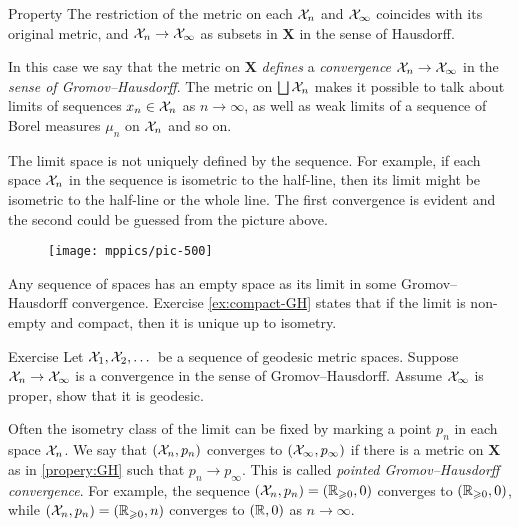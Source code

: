 \begin{thm}{Property}\label{propery:GH}
The restriction of the metric on each $\mathcal{X}_n$ and $\mathcal{X}_\infty$ coincides with its original metric, 
and $\mathcal{X}_n\to \mathcal{X}_\infty$ as subsets in $\bm{X}$ in the sense of Hausdorff.
\end{thm}

In this case we say that the metric on $\bm{X}$ \textit{defines} a \emph{convergence} $\mathcal{X}_n\to \mathcal{X}_\infty$ in the {}\emph{sense of Gromov--Hausdorff}.
The metric on  $\bigsqcup \mathcal{X}_n$ makes it possible to talk about limits of sequences $x_n\in \mathcal{X}_n$ as $n\to\infty$, as well as weak limits of a sequence of Borel measures $\mu_n$ on $\mathcal{X}_n$ and so on.

The limit space is not uniquely defined by the sequence.
For example, if each space $\mathcal{X}_n$ in the sequence is isometric to the half-line, then its limit might be isometric to the half-line or the whole line.
The first convergence is evident and the second could be guessed from the picture above.

\begin{figure}[ht!]
\vskip-0mm
\centering
\texttt{[image: mppics/pic-500]}
\end{figure}

Any sequence of spaces has an empty space as its limit in some  Gromov--Hausdorff convergence.
Exercise \ref{ex:compact-GH} states that if the limit is non-empty and compact, then it is unique up to isometry. 

\begin{thm}{Exercise}\label{ex:geod-closed}
Let $\mathcal{X}_1,\mathcal{X}_2,\dots$ be a sequence of geodesic metric spaces.
Suppose $\mathcal{X}_n\to \mathcal{X}_\infty$ is a convergence in the sense of Gromov--Hausdorff.
Assume $\mathcal{X}_\infty$ is proper, show that it is geodesic.
\end{thm}

Often the isometry class of the limit can be fixed by marking a point $p_n$ in each space $\mathcal{X}_n$.
We say that $(\mathcal{X}_n,p_n)$ converges to $(\mathcal{X}_\infty,p_\infty)$ if there is a metric on $\bm{X}$ as in \ref{propery:GH} such that $p_n\to p_\infty$.
This is called \emph{pointed Gromov--Hausdorff convergence}.
For example, the sequence $(\mathcal{X}_n,p_n)=(\mathbb{R}_{\geqslant0},0)$ converges to $(\mathbb{R}_{\geqslant0},0)$, while $(\mathcal{X}_n,p_n)=(\mathbb{R}_{\geqslant0},n)$ converges to $(\mathbb{R},0)$ as $n\to \infty$.

